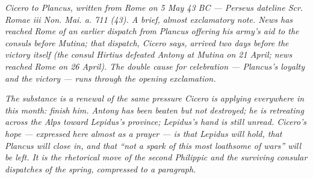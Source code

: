 
\textit{Cicero to Plancus, written from Rome on 5 May 43 BC
--- Perseus dateline \textit{Scr. Romae iii Non. Mai. a. 711
(43)}. A brief, almost exclamatory note. News has reached
Rome of an earlier dispatch from Plancus offering his army's
aid to the consuls before Mutina; that dispatch, Cicero says,
arrived two days before the victory itself (the consul Hirtius
defeated Antony at Mutina on 21 April; news reached Rome on
26 April). The double cause for celebration --- Plancus's
loyalty and the victory --- runs through the opening
exclamation.}

\textit{The substance is a renewal of the same pressure
Cicero is applying everywhere in this month: finish him.
Antony has been beaten but not destroyed; he is retreating
across the Alps toward Lepidus's province; Lepidus's hand is
still unread. Cicero's hope --- expressed here almost as a
prayer --- is that Lepidus will hold, that Plancus will close
in, and that ``not a spark of this most loathsome of wars''
will be left. It is the rhetorical move of the second
Philippic and the surviving consular dispatches of the spring,
compressed to a paragraph.}
